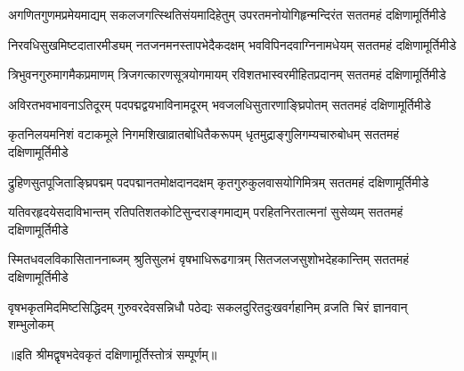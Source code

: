 
\fourlineindentedshloka
{अगणितगुणमप्रमेयमाद्यम्}
{सकलजगत्स्थितिसंयमादिहेतुम्}
{उपरतमनोयोगिहृन्मन्दिरंत}
{सततमहं दक्षिणामूर्तिमीडे}

\fourlineindentedshloka
{निरवधिसुखमिष्टदातारमीड्यम्}
{नतजनमनस्तापभेदैकदक्षम्}
{भवविपिनदवाग्निनामधेयम्}
{सततमहं दक्षिणामूर्तिमीडे}

\fourlineindentedshloka
{त्रिभुवनगुरुमागमैकप्रमाणम्}
{त्रिजगत्कारणसूत्रयोगमायम्}
{रविशतभास्वरमीहितप्रदानम्}
{सततमहं दक्षिणामूर्तिमीडे}

\fourlineindentedshloka
{अविरतभवभावनाऽतिदूरम्}
{पदपद्मद्वयभाविनामदूरम्}
{भवजलधिसुतारणाङ्घ्रिपोतम्}
{सततमहं दक्षिणामूर्तिमीडे}

\fourlineindentedshloka
{कृतनिलयमनिशं वटाकमूले}
{निगमशिखाव्रातबोधितैकरूपम्}
{धृतमुद्राङ्गुलिगम्यचारुबोधम्}
{सततमहं दक्षिणामूर्तिमीडे}

\fourlineindentedshloka
{द्रुहिणसुतपूजिताङ्घ्रिपद्मम्}
{पदपद्मानतमोक्षदानदक्षम्}
{कृतगुरुकुलवासयोगिमित्रम्}
{सततमहं दक्षिणामूर्तिमीडे}

\fourlineindentedshloka
{यतिवरहृदयेसदाविभान्तम्}
{रतिपतिशतकोटिसुन्दराङ्गमाद्यम्}
{परहितनिरतात्मनां सुसेव्यम्}
{सततमहं दक्षिणामूर्तिमीडे}

\fourlineindentedshloka
{स्मितधवलविकासिताननाब्जम्}
{श्रुतिसुलभं वृषभाधिरूढगात्रम्}
{सितजलजसुशोभदेहकान्तिम्}
{सततमहं दक्षिणामूर्तिमीडे}

\fourlineindentedshloka
{वृषभकृतमिदमिष्टसिद्धिदम्}
{गुरुवरदेवसन्निधौ पठेद्यः}
{सकलदुरितदुःखवर्गहानिम्}
{व्रजति चिरं ज्ञानवान् शम्भुलोकम्}

॥इति श्रीमद्वृषभदेवकृतं दक्षिणामूर्तिस्तोत्रं सम्पूर्णम्॥